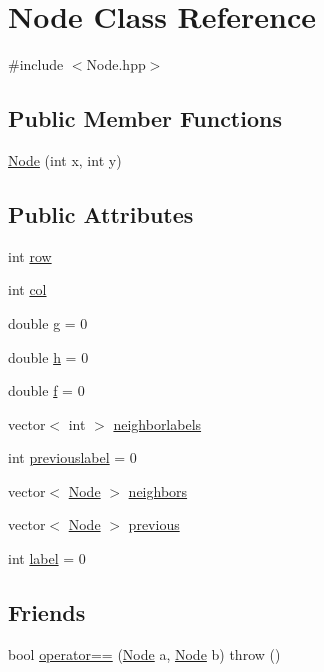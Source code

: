 \hypertarget{classNode}{}\section{Node Class Reference}
\label{classNode}


{\ttfamily \#include $<$Node.\+hpp$>$}

\subsection*{Public Member Functions}
\begin{DoxyCompactItemize}
\item 
\hyperlink{classNode_a23a19f53dfbb18fec58cdac90de3d144}{Node} (int x, int y)
\end{DoxyCompactItemize}
\subsection*{Public Attributes}
\begin{DoxyCompactItemize}
\item 
int \hyperlink{classNode_ac13876b3a7e7e1f316bcd922204e5baa}{row}
\item 
int \hyperlink{classNode_abdb252855cd894ac2d09b16ff1446a3a}{col}
\item 
double \hyperlink{classNode_af93b606cf10abfe1766617ad9de59b01}{g} = 0
\item 
double \hyperlink{classNode_ae96fc081027353fbe793c35ea511116b}{h} = 0
\item 
double \hyperlink{classNode_aa78fc6cd04892bc631b80d023ef088c4}{f} = 0
\item 
vector$<$ int $>$ \hyperlink{classNode_a85bbcd7c4153edd6075b2f3547633ae1}{neighborlabels}
\item 
int \hyperlink{classNode_acf96db5e58c9826e10c4c07b2dd70113}{previouslabel} = 0
\item 
vector$<$ \hyperlink{classNode}{Node} $>$ \hyperlink{classNode_a11950d219110a00069a2135d8815b2d9}{neighbors}
\item 
vector$<$ \hyperlink{classNode}{Node} $>$ \hyperlink{classNode_aa0ce37b5ddcc3dca47ce94f9a9b580fb}{previous}
\item 
int \hyperlink{classNode_ab2c4f74231b19640104ac28fd17dae18}{label} = 0
\end{DoxyCompactItemize}
\subsection*{Friends}
\begin{DoxyCompactItemize}
\item 
bool \hyperlink{classNode_a25c0d19e60219456d5215abc584df43f}{operator==} (\hyperlink{classNode}{Node} a, \hyperlink{classNode}{Node} b)  throw ()
\end{DoxyCompactItemize}


